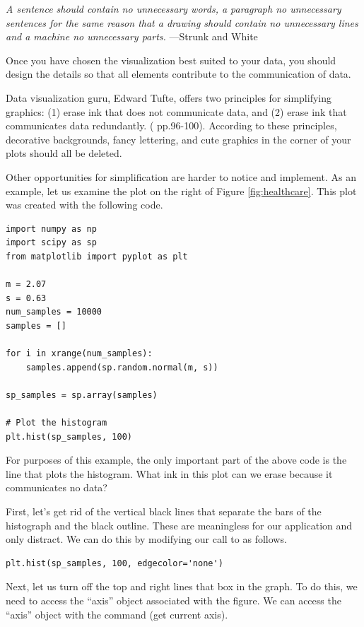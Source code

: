 \noindent\emph{A sentence should contain no unnecessary words, a paragraph no unnecessary sentences for the same reason that a drawing should contain no unnecessary lines and a machine no unnecessary parts.} \small{---Strunk and White}


Once you have chosen the visualization best suited to your data, you should design the details so that all elements contribute to the communication of data. 

Data visualization guru, Edward Tufte, offers two principles for simplifying graphics: (1) erase ink that does not communicate data, and (2) erase ink that communicates data redundantly.  (\cite{tufte2001} pp.96-100). According to these principles, decorative backgrounds, fancy lettering, and cute graphics in the corner of your plots should all be deleted.

Other opportunities for simplification are harder to notice and implement. As an example, let us examine the plot on the right of Figure \ref{fig:healthcare}. 
This plot was created with the following code.

\begin{lstlisting}
import numpy as np
import scipy as sp
from matplotlib import pyplot as plt

m = 2.07
s = 0.63
num_samples = 10000
samples = []

for i in xrange(num_samples):
    samples.append(sp.random.normal(m, s)) 

sp_samples = sp.array(samples)

# Plot the histogram
plt.hist(sp_samples, 100)
\end{lstlisting}

For purposes of this example, the only important part of the above code is the line  that plots the histogram. 
What ink in this plot can we erase because it communicates no data?

First, let's get rid of the vertical black lines that separate the bars of the histograph and the black outline. These are meaningless for our application and only distract. 
We can do this by modifying our call to  as follows.

\begin{lstlisting}
plt.hist(sp_samples, 100, edgecolor='none')
\end{lstlisting}

Next, let us turn off the top and right lines that box in the graph. 
To do this, we need to access the ``axis'' object associated with the figure. 
We can access the ``axis'' object with the command  (get current axis).

